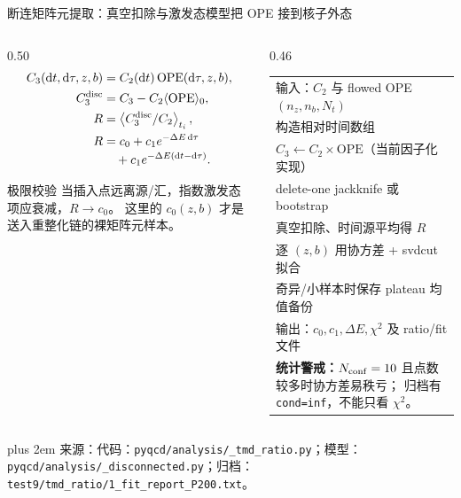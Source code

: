 \documentclass[UTF8,aspectratio=169,11pt]{ctexbeamer}
\newcommand{\source}[1]{%
  \par\vspace{0.02em}\begingroup\fontsize{6}{6.8}\selectfont\raggedright\sloppy
  \setlength{\emergencystretch}{3em}\rightskip=0pt plus 2em
  \color{muted}来源：#1\par\endgroup}
\begin{document}
\begin{frame}[t]{断连矩阵元提取：真空扣除与激发态模型把 OPE 接到核子外态}
  \begin{columns}[T,totalwidth=\textwidth]
    \begin{column}{0.50\textwidth}
      \begin{align*}
        C_3(\mathrm dt,\mathrm d\tau,z,b)&=C_2(\mathrm dt)\,\mathrm{OPE}(\mathrm d\tau,z,b),\\
        C_3^{\rm disc}&=C_3-C_2\langle\mathrm{OPE}\rangle_0,\\
        R&=\left\langle C_3^{\rm disc}/C_2\right\rangle_{t_i},\\
        R&=c_0+c_1e^{-\Delta E\,\mathrm d\tau}\\[-0.2em]
        &\quad+c_1e^{-\Delta E(\mathrm dt-\mathrm d\tau)}.
      \end{align*}
      \begin{block}{极限校验}
        当插入点远离源/汇，指数激发态项应衰减，\(R\to c_0\)。
        这里的 \(c_0(z,b)\) 才是送入重整化链的裸矩阵元样本。
      \end{block}
    \end{column}
    \begin{column}{0.46\textwidth}
      \scriptsize
      \begin{tabularx}{0.94\linewidth}{@{}X@{}}
        输入：\(C_2\) 与 flowed OPE \((n_z,n_b,N_t)\)\\
        \quad 构造相对时间数组\\
        \quad \(C_3\gets C_2\times\mathrm{OPE}\)（当前因子化实现）\\
        \quad delete-one jackknife 或 bootstrap\\
        \quad 真空扣除、时间源平均得 \(R\)\\
        \quad 逐 \((z,b)\) 用协方差 + svdcut 拟合\\
        \quad 奇异/小样本时保存 plateau 均值备份\\
        输出：\(c_0,c_1,\Delta E,\chi^2\) 及 ratio/fit 文件\\[0.3em]
        \textbf{统计警戒：}\(N_{\rm conf}=10\) 且点数较多时协方差易秩亏；
        归档有 \texttt{cond=inf}，不能只看 \(\chi^2\)。
      \end{tabularx}
    \end{column}
  \end{columns}
  \vspace{-0.10em}
  \source{代码：\nolinkurl{pyqcd/analysis/_tmd_ratio.py}；模型：\nolinkurl{pyqcd/analysis/_disconnected.py}；归档：\nolinkurl{test9/tmd_ratio/1_fit_report_P200.txt}。}
\end{frame}
\end{document}
